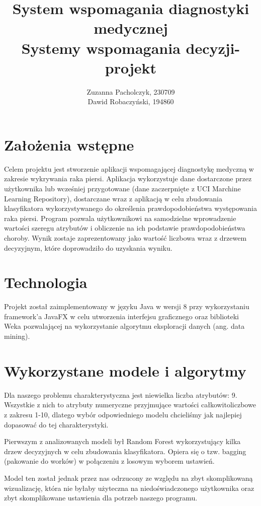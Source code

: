 \documentclass{article}
\title{System wspomagania diagnostyki medycznej
\\ Systemy wspomagania decyzji- projekt}
\author{Zuzanna Pacholczyk, 230709 \\ 
		Dawid Robaczyński, 194860}
\begin{document}
\maketitle

\section{Założenia wstępne}

Celem projektu jest stworzenie aplikacji wspomagającej diagnostykę medyczną w zakresie wykrywania raka piersi. Aplikacja wykorzystuje dane dostarczone przez użytkownika lub wcześniej przygotowane (dane zaczerpnięte z UCI Marchine Learning Repository), dostarczane wraz z aplikacją w celu zbudowania klasyfikatora wykorzystywanego do określenia prawdopodobieństwa występowania raka piersi. Program pozwala użytkownikowi na samodzielne wprowadzenie wartości szeregu atrybutów i obliczenie na ich podstawie prawdopodobieństwa choroby. Wynik zostaje zaprezentowany jako wartość liczbowa wraz z drzewem decyzyjnym, które doprowadziło do uzyskania wyniku.

\section{Technologia}

Projekt został zaimplementowany w języku Java w wersji 8 przy wykorzystaniu framework'a JavaFX w celu utworzenia interfejsu graficznego oraz biblioteki Weka pozwalającej na wykorzystanie algorytmu eksploracji danych (ang. data mining).

\section{Wykorzystane modele i algorytmy}

Dla naszego problemu charakterystyczna jest niewielka liczba atrybutów: 9. Wszystkie z nich to atrybuty numeryczne przyjmujące wartości całkowitoliczbowe z zakresu 1-10, dlatego wybór odpowiedniego modelu chcieliśmy jak najlepiej dopasować do tej charakterystyki.

Pierwszym z analizowanych modeli był Random Forest wykorzystujący kilka drzew decyzyjnych w celu zbudowania klasyfikatora. Opiera się o tzw. bagging (pakowanie do worków) w połączeniu z losowym wyborem ustawień. 

Model ten został jednak przez nas odrzucony ze względu na zbyt skomplikowaną wizualizację, która nie byłaby użyteczna na niedoświadczonego użytkownika oraz zbyt skomplikowane ustawienia dla potrzeb naszego programu.
\end{document}
